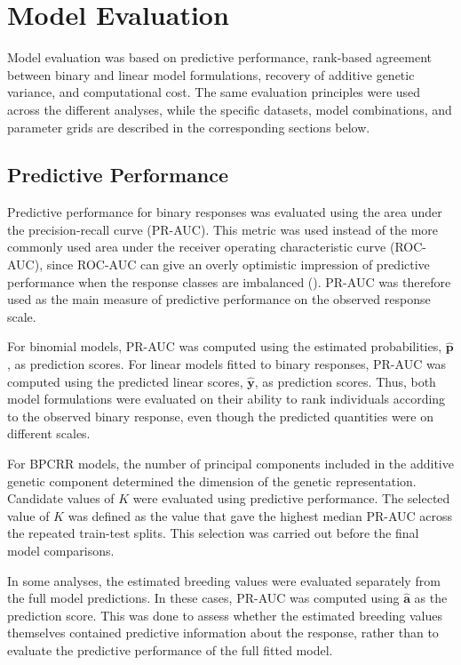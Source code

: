 \section{Model Evaluation}\label{sec:model_eval}

Model evaluation was based on predictive performance, rank-based agreement between binary and linear model formulations, recovery of additive genetic variance, and computational cost. The same evaluation principles were used across the different analyses, while the specific datasets, model combinations, and parameter grids are described in the corresponding sections below.

\subsection{Predictive Performance}

Predictive performance for binary responses was evaluated using the area under the precision-recall curve (PR-AUC). This metric was used instead of the more commonly used area under the receiver operating characteristic curve (ROC-AUC), since ROC-AUC can give an overly optimistic impression of predictive performance when the response classes are imbalanced (\cite{saito_precisionrecall_2015}). PR-AUC was therefore used as the main measure of predictive performance on the observed response scale.

For binomial models, PR-AUC was computed using the estimated probabilities, $\hat{\mathbf{p}}$, as prediction scores. For linear models fitted to binary responses, PR-AUC was computed using the predicted linear scores, $\hat{\mathbf{y}}$, as prediction scores. Thus, both model formulations were evaluated on their ability to rank individuals according to the observed binary response, even though the predicted quantities were on different scales.

For BPCRR models, the number of principal components included in the additive genetic component determined the dimension of the genetic representation. Candidate values of $K$ were evaluated using predictive performance. The selected value of $K$ was defined as the value that gave the highest median PR-AUC across the repeated train-test splits. This selection was carried out before the final model comparisons.

In some analyses, the estimated breeding values were evaluated separately from the full model predictions. In these cases, PR-AUC was computed using $\hat{\mathbf{a}}$ as the prediction score. This was done to assess whether the estimated breeding values themselves contained predictive information about the response, rather than to evaluate the predictive performance of the full fitted model.


